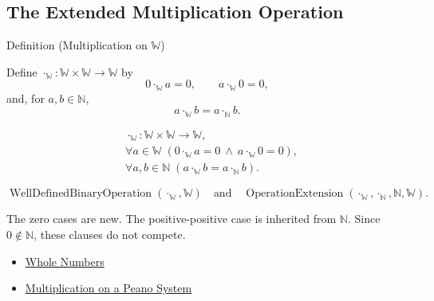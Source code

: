 \subsection*{The Extended Multiplication Operation}

\begin{definitionbox}{Definition (Multiplication on \texorpdfstring{$\mathbb{W}$}{W})}
\begin{definition}
\label{def:multiplication-on-w}
Define $\cdot_{\mathbb{W}}:\mathbb{W}\times\mathbb{W}\to\mathbb{W}$ by
\[
0\cdot_{\mathbb{W}}a=0,\qquad
a\cdot_{\mathbb{W}}0=0,
\]
and, for $a,b\in\mathbb{N}$,
\[
a\cdot_{\mathbb{W}}b=a\cdot_{\mathbb{N}}b.
\]
\end{definition}
\end{definitionbox}

\begin{remark*}
\[
\begin{aligned}
&\cdot_{\mathbb{W}}:\mathbb{W}\times\mathbb{W}\to\mathbb{W},\\
&\forall a\in\mathbb{W}\;(0\cdot_{\mathbb{W}}a=0\ \wedge\ a\cdot_{\mathbb{W}}0=0),\\
&\forall a,b\in\mathbb{N}\;
  (a\cdot_{\mathbb{W}}b=a\cdot_{\mathbb{N}}b).
\end{aligned}
\]
\end{remark*}

\begin{remark*}
\[
\operatorname{WellDefinedBinaryOperation}(\cdot_{\mathbb{W}},\mathbb{W})
\quad\text{and}\quad
\operatorname{OperationExtension}
(\cdot_{\mathbb{W}},\cdot_{\mathbb{N}},\mathbb{N},\mathbb{W}).
\]
\end{remark*}

\begin{remark*}[Interpretation]
The zero cases are new. The positive-positive case is inherited from
$\mathbb{N}$. Since $0\notin\mathbb{N}$, these clauses do not compete.
\end{remark*}

\begin{dependencies}
\begin{itemize}
  \item \hyperref[def:whole-numbers]{Whole Numbers}
  \item \hyperref[def:multiplication-on-peano-system]{Multiplication on a Peano System}
\end{itemize}
\end{dependencies}

